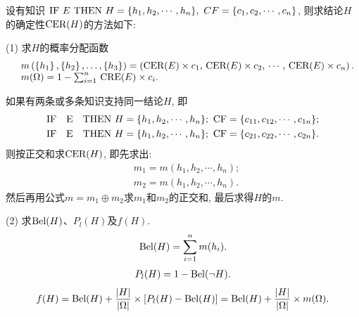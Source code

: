 设有知识 $\textup{IF}\,\, E \,\, \textup{THEN} \,\, H=\{h_1, h_2, \cdots , h_n\}, \,\, CF=\{c_1, c_2, \cdots, c_n\}$, 则求结论$H$的确定性$\textup{CER}(H)$的方法如下:

(1) 求$H$的概率分配函数
\begin{align}
    \begin{array}{ll}
        &m\left(\left\{h_{1}\right\},\left\{h_{2}\right\}, \ldots,\left\{h_{3}\right\} \right)
           =\left( \textup{CER}(E) \times c_{1},\, \textup{CER}(E) \times c_{2},\, \cdots,\, \textup{CER}(E) \times c_{n}\right).\\
        &m(\Omega)=1-\sum_{i=1}^{n} \,\textup{CRE}(E) \times c_{i}.
    \end{array}
\end{align}

\begin{example}
如果有两条或多条知识支持同一结论$H$, 即
 \begin{align}
    &\textup{IF \,\,  E \,\,  THEN}   \,\, H=\{h_1, h_2, \cdots , h_n\};\,\,  \textup{CF}=\{c_{11}, c_{12}, \cdots , c_{1n}\};\\
    &\textup{IF \,\,  E \,\,  THEN}  \,\,  H=\{h_1, h_2, \cdots , h_n\};\,\,  \textup{CF}=\{c_{21}, c_{22}, \cdots , c_{2n}\}.
\end{align}
则按正交和求$\textup{CER}(H)$, 即先求出:
\begin{align*}
    &m_1=m({h_1},{h_2},\cdots,{h_n});\\
    &m_2=m({h_1},{h_2},\cdots,{h_n}).
\end{align*}
然后再用公式$m=m_{1} \oplus m_{2}$求$m_1$和$m_2$的正交和, 最后求得$H$的$m$.
\end{example}

(2) 求$\textup{Bel}(H)$、$P_l(H)$及$f(H)$.
\begin{align*}
    \textup{Bel}(H)=\sum_{i=1}^{n} m(h_i).
\end{align*}
\begin{align*}
    P_l(H)=1-\textup{Bel}(\neg H).
\end{align*}
\begin{align*}
    f(H)=\textup{Bel}(H)+\frac{|H|}{|\Omega|} \times [P_l(H)-\textup{Bel}(H)] = \textup{Bel}(H)+\frac{|H|}{|\Omega|} \times m(\Omega).
\end{align*}

